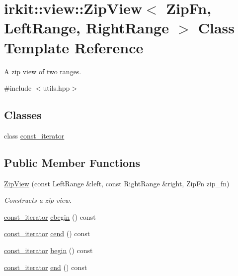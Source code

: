 \hypertarget{classirkit_1_1view_1_1ZipView}{}\section{irkit\+:\+:view\+:\+:Zip\+View$<$ Zip\+Fn, Left\+Range, Right\+Range $>$ Class Template Reference}
\label{classirkit_1_1view_1_1ZipView}


A zip view of two ranges.  




{\ttfamily \#include $<$utils.\+hpp$>$}

\subsection*{Classes}
\begin{DoxyCompactItemize}
\item 
class \hyperlink{classirkit_1_1view_1_1ZipView_1_1const__iterator}{const\+\_\+iterator}
\end{DoxyCompactItemize}
\subsection*{Public Member Functions}
\begin{DoxyCompactItemize}
\item 
\hyperlink{classirkit_1_1view_1_1ZipView_a581e90890462717bbdac0f02dc343641}{Zip\+View} (const Left\+Range \&left, const Right\+Range \&right, Zip\+Fn zip\+\_\+fn)
\begin{DoxyCompactList}\small\item\em Constructs a zip view. \end{DoxyCompactList}\item 
\hyperlink{classirkit_1_1view_1_1ZipView_1_1const__iterator}{const\+\_\+iterator} \hyperlink{classirkit_1_1view_1_1ZipView_ab92e5ce12bcf45a9a797294d5b2e97e7}{cbegin} () const
\item 
\hyperlink{classirkit_1_1view_1_1ZipView_1_1const__iterator}{const\+\_\+iterator} \hyperlink{classirkit_1_1view_1_1ZipView_a5ba1f0456da3ffc049e59418b4a01a3f}{cend} () const
\item 
\hyperlink{classirkit_1_1view_1_1ZipView_1_1const__iterator}{const\+\_\+iterator} \hyperlink{classirkit_1_1view_1_1ZipView_af278d23b14dd71c1c5d7e145a5d0771b}{begin} () const
\item 
\hyperlink{classirkit_1_1view_1_1ZipView_1_1const__iterator}{const\+\_\+iterator} \hyperlink{classirkit_1_1view_1_1ZipView_ab8a193bad7c33b93367014f32e9cf360}{end} () const
\end{DoxyCompactItemize}


